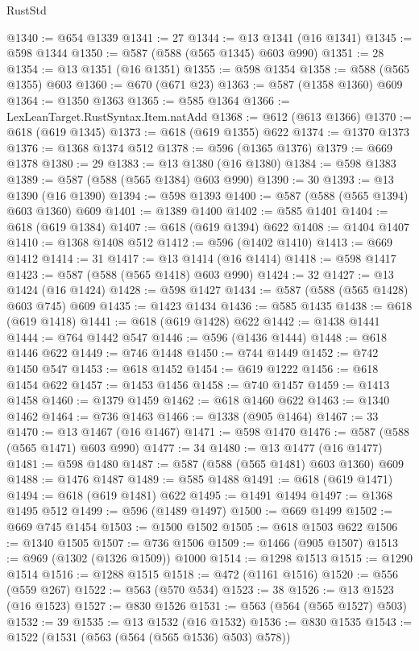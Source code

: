 \begin{lexlean}{RustStd}
\begin{coremodule}
@1340 := @654 @1339
@1341 := 27
@1344 := @13 @1341 (@16 @1341)
@1345 := @598 @1344
@1350 := @587 (@588 (@565 @1345) @603 @990)
@1351 := 28
@1354 := @13 @1351 (@16 @1351)
@1355 := @598 @1354
@1358 := @588 (@565 @1355) @603
@1360 := @670 (@671 @23)
@1363 := @587 (@1358 @1360) @609
@1364 := @1350 @1363
@1365 := @585 @1364
@1366 := LexLeanTarget.RustSyntax.Item.natAdd
@1368 := @612 (@613 @1366)
@1370 := @618 (@619 @1345)
@1373 := @618 (@619 @1355) @622
@1374 := @1370 @1373
@1376 := @1368 @1374 @512
@1378 := @596 (@1365 @1376)
@1379 := @669 @1378
@1380 := 29
@1383 := @13 @1380 (@16 @1380)
@1384 := @598 @1383
@1389 := @587 (@588 (@565 @1384) @603 @990)
@1390 := 30
@1393 := @13 @1390 (@16 @1390)
@1394 := @598 @1393
@1400 := @587 (@588 (@565 @1394) @603 @1360) @609
@1401 := @1389 @1400
@1402 := @585 @1401
@1404 := @618 (@619 @1384)
@1407 := @618 (@619 @1394) @622
@1408 := @1404 @1407
@1410 := @1368 @1408 @512
@1412 := @596 (@1402 @1410)
@1413 := @669 @1412
@1414 := 31
@1417 := @13 @1414 (@16 @1414)
@1418 := @598 @1417
@1423 := @587 (@588 (@565 @1418) @603 @990)
@1424 := 32
@1427 := @13 @1424 (@16 @1424)
@1428 := @598 @1427
@1434 := @587 (@588 (@565 @1428) @603 @745) @609
@1435 := @1423 @1434
@1436 := @585 @1435
@1438 := @618 (@619 @1418)
@1441 := @618 (@619 @1428) @622
@1442 := @1438 @1441
@1444 := @764 @1442 @547
@1446 := @596 (@1436 @1444)
@1448 := @618 @1446 @622
@1449 := @746 @1448
@1450 := @744 @1449
@1452 := @742 @1450 @547
@1453 := @618 @1452
@1454 := @619 @1222
@1456 := @618 @1454 @622
@1457 := @1453 @1456
@1458 := @740 @1457
@1459 := @1413 @1458
@1460 := @1379 @1459
@1462 := @618 @1460 @622
@1463 := @1340 @1462
@1464 := @736 @1463
@1466 := @1338 (@905 @1464)
@1467 := 33
@1470 := @13 @1467 (@16 @1467)
@1471 := @598 @1470
@1476 := @587 (@588 (@565 @1471) @603 @990)
@1477 := 34
@1480 := @13 @1477 (@16 @1477)
@1481 := @598 @1480
@1487 := @587 (@588 (@565 @1481) @603 @1360) @609
@1488 := @1476 @1487
@1489 := @585 @1488
@1491 := @618 (@619 @1471)
@1494 := @618 (@619 @1481) @622
@1495 := @1491 @1494
@1497 := @1368 @1495 @512
@1499 := @596 (@1489 @1497)
@1500 := @669 @1499
@1502 := @669 @745 @1454
@1503 := @1500 @1502
@1505 := @618 @1503 @622
@1506 := @1340 @1505
@1507 := @736 @1506
@1509 := @1466 (@905 @1507)
@1513 := @969 (@1302 (@1326 @1509)) @1000
@1514 := @1298 @1513
@1515 := @1290 @1514
@1516 := @1288 @1515
@1518 := @472 (@1161 @1516)
@1520 := @556 (@559 @267)
@1522 := @563 (@570 @534)
@1523 := 38
@1526 := @13 @1523 (@16 @1523)
@1527 := @830 @1526
@1531 := @563 (@564 (@565 @1527) @503)
@1532 := 39
@1535 := @13 @1532 (@16 @1532)
@1536 := @830 @1535
@1543 := @1522 (@1531 (@563 (@564 (@565 @1536) @503) @578))

\end{coremodule}
\end{lexlean}
